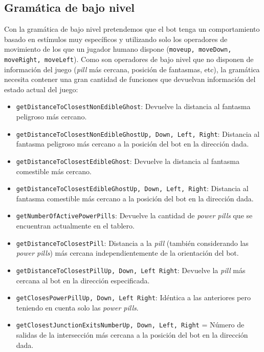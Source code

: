 \subsection{Gramática de bajo nivel}
Con la gramática de bajo nivel pretendemos que el bot tenga un comportamiento basado en estímulos muy específicos y utilizando solo los operadores de movimiento de los que un jugador humano dispone (\texttt{moveup, moveDown, moveRight, moveLeft}). Como son operadores de bajo nivel que no disponen de información del juego (\textit{pill} más cercana, posición de fantasmas, etc), la gramática necesita contener una gran cantidad de funciones que devuelvan información del estado actual del juego:
\begin{itemize}
\item \texttt{getDistanceToClosestNonEdibleGhost}: Devuelve la distancia al fantasma peligroso más cercano.

\item \texttt{getDistanceToClosestNonEdibleGhost{Up, Down, Left, Right}}: Distancia al fantasma peligroso más cercano a la posición del bot en la dirección dada.

\item \texttt{getDistanceToClosestEdibleGhost}: Devuelve la distancia al fantasma comestible más cercano.

\item \texttt{getDistanceToClosestEdibleGhost{Up, Down, Left, Right}}: Distancia al fantasma comestible más cercano a la posición del bot en la dirección dada.

\item \texttt{getNumberOfActivePowerPills}: Devuelve la cantidad de \textit{power pills} que se encuentran actualmente en el tablero.

\item \texttt{getDistanceToClosestPill}: Distancia a la \textit{pill} (también considerando las \textit{power pills}) más cercana independientemente de la orientación del bot.

\item \texttt{getDistanceToClosestPill{Up, Down, Left Right}}: Devuelve la \textit{pill} más cercana al bot en la dirección especificada.

\item \texttt{getClosesPowerPill{Up, Down, Left Right}}: Idéntica a las anteriores pero teniendo en cuenta solo las \textit{power pills}.

\item \texttt{getClosestJunctionExitsNumber{Up, Down, Left, Right}} = Número de salidas de la intersección más cercana a la posición del bot en la dirección dada.


\end{itemize}
